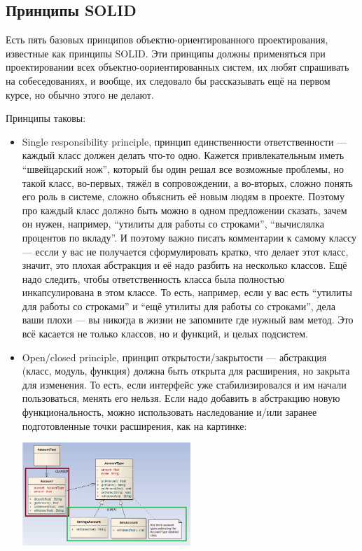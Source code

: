 \documentclass[a5paper]{article}
\begin{document}
\subsection{Принципы SOLID}

Есть пять базовых принципов объектно-ориентированного проектирования, известные как принципы SOLID. Эти принципы должны применяться при проектировании всех объектно-оориентированных систем, их любят спрашивать на собеседованиях, и вообще, их следовало бы рассказывать ещё на первом курсе, но обычно этого не делают.

Принципы таковы:

\begin{itemize}
	\item Single responsibility principle, принцип единственности ответственности --- каждый класс должен делать что-то одно. Кажется привлекательным иметь ``швейцарский нож'', который бы один решал все возможные проблемы, но такой класс, во-первых, тяжёл в сопровождении, а во-вторых, сложно понять его роль в системе, сложно объяснить её новым людям в проекте. Поэтому про каждый класс должно быть можно в одном предложении сказать, зачем он нужен, например, ``утилиты для работы со строками'', ``вычислялка процентов по вкладу''. И поэтому важно писать комментарии к самому классу --- ессли у вас не получается сформулировать кратко, что делает этот класс, значит, это плохая абстракция и её надо разбить на несколько классов. Ещё надо следить, чтобы ответственность класса была полностью инкапсулирована в этом классе. То есть, например, если у вас есть ``утилиты для работы со строками'' и ``ещё утилиты для работы со строками'', дела ваши плохи --- вы никогда в жизни не запомните где нужный вам метод. Это всё касается не только классов, но и функций, и целых подсистем.
	\item Open/closed principle, принцип открытости/закрытости --- абстракция (класс, модуль, функция) должна быть открыта для расширения, но закрыта для изменения. То есть, если интерфейс уже стабилизировался и им начали пользоваться, менять его нельзя. Если надо добавить в абстракцию новую функциональность, можно использовать наследование и/или заранее подготовленные точки расширения, как на картинке:
		\begin{center}
			\includegraphics[width=0.5\textwidth]{openClosedPrinciple.png}
		\end{center}


\end{itemize}
\end{document}
